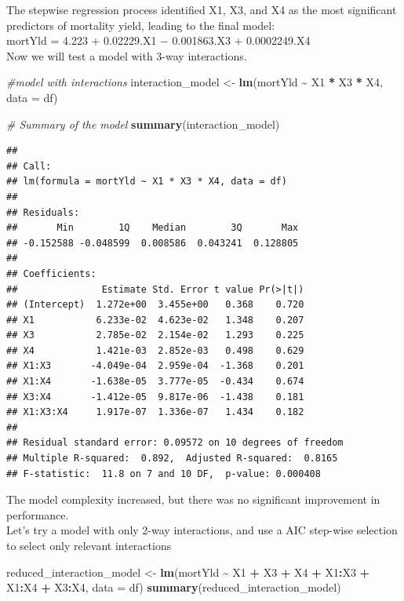 \documentclass[
  12pt,
]{article}
\newenvironment{Shaded}{\begin{snugshade}}{\end{snugshade}}
\newcommand{\AttributeTok}[1]{\textcolor[rgb]{0.13,0.29,0.53}{#1}}
\newcommand{\CommentTok}[1]{\textcolor[rgb]{0.56,0.35,0.01}{\textit{#1}}}
\newcommand{\FunctionTok}[1]{\textcolor[rgb]{0.13,0.29,0.53}{\textbf{#1}}}
\newcommand{\NormalTok}[1]{#1}
\newcommand{\OtherTok}[1]{\textcolor[rgb]{0.56,0.35,0.01}{#1}}
\newcommand{\SpecialCharTok}[1]{\textcolor[rgb]{0.81,0.36,0.00}{\textbf{#1}}}
\begin{document}
The stepwise regression process identified X1, X3, and X4 as the most
significant predictors of mortality yield, leading to the final model:\\
mortYld = 4.223 + 0.02229.X1 − 0.001863.X3 + 0.0002249.X4\\
Now we will test a model with 3-way interactions.

\begin{Shaded}
\begin{Highlighting}[]
\CommentTok{\#model with interactions}
\NormalTok{interaction\_model }\OtherTok{\textless{}{-}} \FunctionTok{lm}\NormalTok{(mortYld }\SpecialCharTok{\textasciitilde{}}\NormalTok{ X1 }\SpecialCharTok{*}\NormalTok{ X3 }\SpecialCharTok{*}\NormalTok{ X4, }\AttributeTok{data =}\NormalTok{ df)}

\CommentTok{\# Summary of the model}
\FunctionTok{summary}\NormalTok{(interaction\_model)}
\end{Highlighting}
\end{Shaded}

\begin{verbatim}
## 
## Call:
## lm(formula = mortYld ~ X1 * X3 * X4, data = df)
## 
## Residuals:
##       Min        1Q    Median        3Q       Max 
## -0.152588 -0.048599  0.008586  0.043241  0.128805 
## 
## Coefficients:
##               Estimate Std. Error t value Pr(>|t|)
## (Intercept)  1.272e+00  3.455e+00   0.368    0.720
## X1           6.233e-02  4.623e-02   1.348    0.207
## X3           2.785e-02  2.154e-02   1.293    0.225
## X4           1.421e-03  2.852e-03   0.498    0.629
## X1:X3       -4.049e-04  2.959e-04  -1.368    0.201
## X1:X4       -1.638e-05  3.777e-05  -0.434    0.674
## X3:X4       -1.412e-05  9.817e-06  -1.438    0.181
## X1:X3:X4     1.917e-07  1.336e-07   1.434    0.182
## 
## Residual standard error: 0.09572 on 10 degrees of freedom
## Multiple R-squared:  0.892,  Adjusted R-squared:  0.8165 
## F-statistic:  11.8 on 7 and 10 DF,  p-value: 0.000408
\end{verbatim}

The model complexity increased, but there was no significant improvement
in performance.\\
Let's try a model with only 2-way interactions, and use a AIC step-wise
selection to select only relevant interactions

\begin{Shaded}
\begin{Highlighting}[]
\NormalTok{reduced\_interaction\_model }\OtherTok{\textless{}{-}} \FunctionTok{lm}\NormalTok{(mortYld }\SpecialCharTok{\textasciitilde{}}\NormalTok{ X1 }\SpecialCharTok{+}\NormalTok{ X3 }\SpecialCharTok{+}\NormalTok{ X4 }\SpecialCharTok{+}\NormalTok{ X1}\SpecialCharTok{:}\NormalTok{X3 }\SpecialCharTok{+}\NormalTok{ X1}\SpecialCharTok{:}\NormalTok{X4 }\SpecialCharTok{+}\NormalTok{ X3}\SpecialCharTok{:}\NormalTok{X4, }\AttributeTok{data =}\NormalTok{ df)}
\FunctionTok{summary}\NormalTok{(reduced\_interaction\_model)}
\end{Highlighting}
\end{Shaded}
\end{document}
